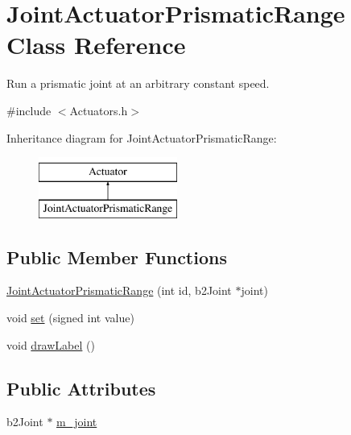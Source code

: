 \hypertarget{classJointActuatorPrismaticRange}{\section{Joint\-Actuator\-Prismatic\-Range Class Reference}
\label{classJointActuatorPrismaticRange}
}


Run a prismatic joint at an arbitrary constant speed.  




{\ttfamily \#include $<$Actuators.\-h$>$}

Inheritance diagram for Joint\-Actuator\-Prismatic\-Range\-:\begin{figure}[H]
\begin{center}
\leavevmode
\includegraphics[height=2.000000cm]{classJointActuatorPrismaticRange}
\end{center}
\end{figure}
\subsection*{Public Member Functions}
\begin{DoxyCompactItemize}
\item 
\hyperlink{classJointActuatorPrismaticRange_ad1e60e9b3b976eeaa276d9194cd30695}{Joint\-Actuator\-Prismatic\-Range} (int id, b2\-Joint $\ast$joint)
\item 
void \hyperlink{classJointActuatorPrismaticRange_a6df9efdb8bf3cea3cffefa977a6f4c02}{set} (signed int value)
\item 
void \hyperlink{classJointActuatorPrismaticRange_a9daa027177e5bd6c0296b3cf4a76e9ab}{draw\-Label} ()
\end{DoxyCompactItemize}
\subsection*{Public Attributes}
\begin{DoxyCompactItemize}
\item 
b2\-Joint $\ast$ \hyperlink{classJointActuatorPrismaticRange_ab272c14737ab32f88291d3999cbbf398}{m\-\_\-joint}
\end{DoxyCompactItemize}


